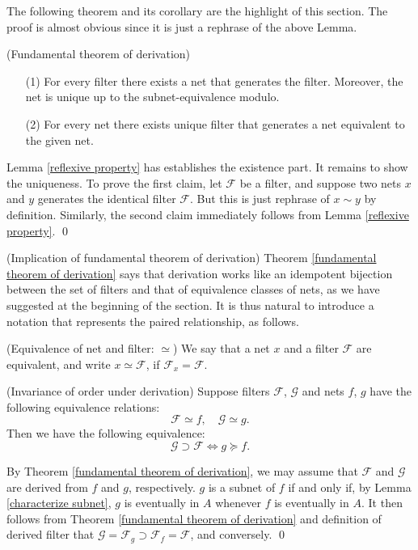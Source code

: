 \documentclass{report}
\begin{document}
The following theorem and its corollary are the highlight of this section. The proof is almost obvious since it is just a rephrase of the above Lemma.
\begin{thm}\label{fundamental theorem of derivation} (Fundamental theorem of derivation)
    \begin{itemize}
        \item[(1)] For every filter there exists a net that generates the filter. Moreover, the net is unique up to the subnet-equivalence modulo.
        \item[(2)] For every net there exists unique filter that generates a net equivalent to the given net.
    \end{itemize}
\end{thm}
\begin{prf}
    Lemma \ref{reflexive property} has establishes the existence part. It remains to show the uniqueness.
    To prove the first claim, let \( \mathscr{F} \) be a filter, and suppose two nets \( x \) and \( y \) generates the identical filter \( \mathscr{F} \). But this is just rephrase of \( x \sim y \) by definition.
    Similarly, the second claim immediately follows from Lemma \ref{reflexive property}.
    \qed\end{prf}

\begin{rem} (Implication of fundamental theorem of derivation)
    Theorem \ref{fundamental theorem of derivation} says that derivation works like an idempotent bijection between the set of filters and that of equivalence classes of nets, as we have suggested at the beginning of the section. It is thus natural to introduce a notation that represents the paired relationship, as follows.
\end{rem}

\begin{dfn} (Equivalence of net and filter: \( \simeq \))
    We say that a net \( x \) and a filter \( \mathscr{F} \) are equivalent, and write \( x \simeq \mathscr{F} \), if \( \mathscr{F}_x = \mathscr{F} \).
\end{dfn}

\begin{cor} (Invariance of order under derivation)\label{invariance order}
    Suppose filters \( \mathscr{F} \), \( \mathscr{G} \) and nets \( f \), \( g \) have the following equivalence relations:
    \[
        \mathscr{F} \simeq f,\quad \mathscr{G} \simeq g.
    \]
    Then we have the following equivalence:
    \[
        \mathscr{G} \supset \mathscr{F} \iff g \succeq f.
    \]
\end{cor}
\begin{prf}
    By Theorem \ref{fundamental theorem of derivation}, we may assume that \( \mathscr{F} \) and \( \mathscr{G} \) are derived from \( f \) and \( g \), respectively. \( g \) is a subnet of \( f \) if and only if, by Lemma \ref{characterize subnet}, \( g \) is eventually in \( A \) whenever \( f \) is eventually in \( A \).
    It then follows from Theorem \ref{fundamental theorem of derivation} and definition of derived filter that \( \mathscr{G} = \mathscr{F}_g \supset \mathscr{F}_f = \mathscr{F} \), and conversely.
    \qed\end{prf}
\end{document}
